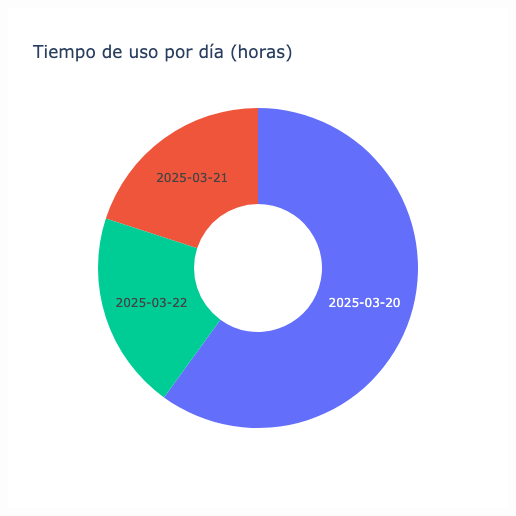 \documentclass{article}
\begin{document}
    \begin{minipage}{0.48\textwidth}
        \centering
        \includegraphics[width=\textwidth]{../img/pie/UD102-180Dias-24-08-2025.png}
    \end{minipage}
    
\end{document}
